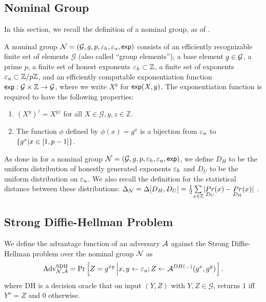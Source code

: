         \subsection{Nominal Group}
        In this section, we recall the definition of a nominal group, as of \cite{EC:ABHKLR21}.
        \begin{definition}
            A nominal group $\mathcal{N} =(\mathcal{G}, g, p, \varepsilon_h , \varepsilon_u , \textsf{exp})$ consists
            of an efficiently recognizable finite set of elements
            $\mathcal{G}$ (also called ``group elements''), a base element
            $g \in \mathcal{G}$, a prime $p$, a finite set of honest
            exponents $\varepsilon_h \subset \mathbb{Z}$, a finite set of
            exponents $\varepsilon_u \subset \mathbb{Z} / p\mathbb{Z}$, and an
            efficiently computable exponentiation function $\textsf{exp} :
            \mathcal{G} \times \mathbb{Z} \rightarrow \mathcal{G}$, where we
            write $X^y$ for $\textsf{exp}(X, y)$.
            The exponentiation function is required to have the following
            properties:
            \begin{enumerate}
            \item $(X^y)^z = X^{yz} $ for all $ X \in \mathcal{G}, y, z \in
                \mathbb{Z}$.
            \item The function $\phi$ defined by $\phi(x) = g^x$ is a
                bijection from $\varepsilon_u$ to $\{g^x | x \in [1, p -
                1]\}$.
            \end{enumerate}
        \end{definition}
        As done in \cite{EC:ABHKLR21} for a nominal group $\mathcal{N} =
        (\mathcal{G}, g, p, \varepsilon_h , \varepsilon_u , \textsf{exp})$, we define $D_H$ to be the uniform
        distribution of honestly generated exponents $\varepsilon_h$ and
        $D_U$ to be the uniform distribution on $\varepsilon_u$.
        We also recall the definition for the statistical distance between
        these distributions: $\Delta_{\mathcal{N}} = \Delta [ D_H, D_U ] =
        \frac{1}{2} \underset{x \in \mathbb{Z}}{\sum} | \underset{D_U}{Pr}(x)
        - \underset{D_H}{Pr}(x) | $ \cite{EC:ABHKLR21}.
        \subsection{Strong Diffie-Hellman Problem}
        \label{sec:strong-dh}

        \begin{definition}
            We define the advantage function of an adversary $\mathcal{A}$
            against the Strong Diffie-Hellman problem over the nominal group
            $\mathcal{N}$ as
            \[
                \text{Adv}_{\mathcal{N}, \mathcal{A}}^{\text{SDH}} = \Pr \left [Z = g^{xy} \left | x,y \leftarrow \varepsilon_u; Z \leftarrow \mathcal{A}^{DH(\cdot, \cdot)}(g^x, g^y) \right. \right].
            \]
            where DH is a decision oracle that on input $(Y, Z)$ with $Y, Z
            \in \mathcal{G}$, returns $1$ iff $Y^x = Z$ and $0$ otherwise.
        \end{definition}
